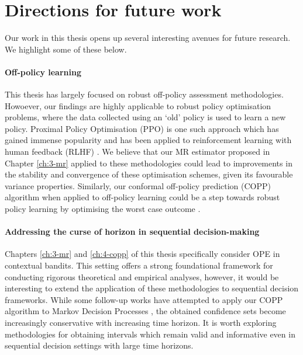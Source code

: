 \section{Directions for future work}
Our work in this thesis opens up several interesting avenues for future research. We highlight some of these below.

\paragraph*{Off-policy learning}
This thesis has largely focused on robust off-policy assessment methodologies. Howoever, our findings are highly applicable to robust policy optimisation problems, where the data collected using an `old’ policy is used to learn a new policy. 
Proximal Policy Optimisation (PPO) \citep{schulman2017proximal} is one such approach which has gained immense popularity and has been applied to reinforcement learning with human feedback (RLHF) \citep{lambert2022illustrating}. 
We believe that our MR estimator proposed in Chapter \ref*{ch:3-mr} applied to these methodologies could lead to improvements in the stability and convergence
of these optimisation schemes, given its favourable variance properties. 
Similarly, our conformal off-policy prediction (COPP) algorithm when applied to off-policy learning could be a
step towards robust policy learning by optimising the worst case outcome \citep{stutz2021learning}.

\paragraph*{Addressing the curse of horizon in sequential decision-making}
Chapters \ref*{ch:3-mr} and \ref*{ch:4-copp} of this thesis specifically consider OPE in contextual bandits. 
This setting offers a strong foundational framework for conducting rigorous theoretical and empirical analyses, 
however, it would be interesting to extend the application of these methodologies to sequential decision frameworks.
While some follow-up works have attempted to apply our COPP algorithm to Markov Decision Processes \citep{foffano2023conformal, zhang2023conformal, kuipers2024conformal}, the obtained confidence sets become increasingly conservative with increasing time horizon. 
It is worth exploring methodologies for obtaining intervals which remain valid and informative even in sequential decision settings with large time horizons.  


